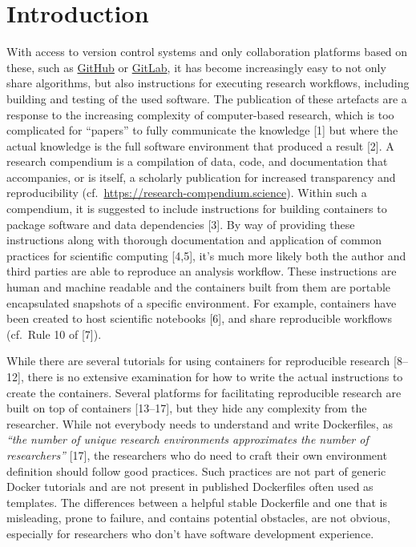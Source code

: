 \documentclass[10pt,letterpaper]{article}
\begin{document}
\linenumbers

\hypertarget{introduction}{%
\section*{Introduction}\label{introduction}}

With access to version control systems and only collaboration platforms
based on these, such as \href{https://github.com}{GitHub} or
\href{https://gitlab.com}{GitLab}, it has become increasingly easy to
not only share algorithms, but also instructions for executing research
workflows, including building and testing of the used software. The
publication of these artefacts are a response to the increasing
complexity of computer-based research, which is too complicated for
``papers'' to fully communicate the knowledge {[}1{]} but where the
actual knowledge is the full software environment that produced a result
{[}2{]}. A research compendium is a compilation of data, code, and
documentation that accompanies, or is itself, a scholarly publication
for increased transparency and reproducibility
(cf.~\url{https://research-compendium.science}). Within such a
compendium, it is suggested to include instructions for building
containers to package software and data dependencies {[}3{]}. By way of
providing these instructions along with thorough documentation and
application of common practices for scientific computing {[}4,5{]}, it's
much more likely both the author and third parties are able to reproduce
an analysis workflow. These instructions are human and machine readable
and the containers built from them are portable encapsulated snapshots
of a specific environment. For example, containers have been created to
host scientific notebooks {[}6{]}, and share reproducible workflows
(cf.~Rule 10 of {[}7{]}).

While there are several tutorials for using containers for reproducible
research {[}8--12{]}, there is no extensive examination for how to write
the actual instructions to create the containers. Several platforms for
facilitating reproducible research are built on top of containers
{[}13--17{]}, but they hide any complexity from the researcher. While
not everybody needs to understand and write Dockerfiles, as \emph{``the
number of unique research environments approximates the number of
researchers''} {[}17{]}, the researchers who do need to craft their own
environment definition should follow good practices. Such practices are
not part of generic Docker tutorials and are not present in published
Dockerfiles often used as templates. The differences between a helpful
stable Dockerfile and one that is misleading, prone to failure, and
contains potential obstacles, are not obvious, especially for
researchers who don't have software development experience.
\end{document}
